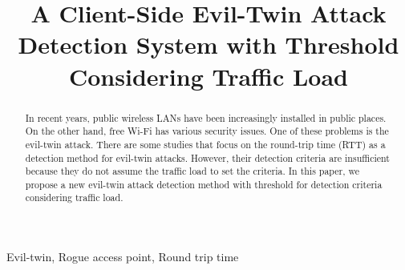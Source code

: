 \documentclass[conference]{IEEEtran}
\begin{document}
\title{A Client-Side Evil-Twin Attack Detection System with Threshold Considering Traffic Load\\

}

\author{
}


\maketitle


\begin{abstract}
In recent years, public wireless LANs have been increasingly installed in public places. On the other hand, free Wi-Fi has various security issues. One of these problems is the evil-twin attack. There are some studies that focus on the round-trip time (RTT) as a detection method for evil-twin attacks. However, their detection criteria are insufficient because they do not assume the traffic load to set the criteria. In this paper, we propose a new evil-twin attack detection method with threshold for detection criteria considering traffic load.  
\end{abstract}

\begin{IEEEkeywords}
Evil-twin, Rogue access point, Round trip time
\end{IEEEkeywords}
\end{document}
